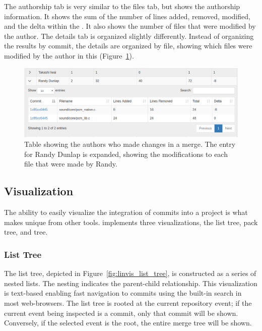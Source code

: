 The authorship tab is very similar to the files tab, but shows the
authorship information. It shows the sum of the number of lines added,
removed, modified, and the delta within the \mt. It also shows the
number of files that were modified by the author. The details tab is
organized slightly differently. Instead of organizing the results by
commit, the details are organized by file, showing which files were
modified by the author in this \mt (Figure~\ref{fig:linvis_authors}).

\begin{figure}[htpb]
  \centering
  \includegraphics[width=\linewidth]{figures/linvis/linvis_authors.png}
  \caption{Table showing the authors who made changes in a merge. The
    entry for Randy Dunlap is expanded, showing the modifications to
    each file that were made by Randy.}
  \label{fig:linvis_authors}
\end{figure}


\subsection{Visualization}
\label{sub:visualization}

The ability to easily visualize the integration of commits into a
project is what makes \tool unique from other tools. \tool implements
three visualizations, the list tree, pack tree, and \rt tree.

\subsubsection{List Tree}

The list tree, depicted in Figure~\ref{fig:linvis_list_tree}, is
constructed as a series of nested lists. The nesting indicates the
parent-child relationship. This visualization is text-based enabling
fast navigation to commits using the built-in search in most
web-browsers. The list tree is rooted at the current repository event;
if the current event being inspected is a commit, only that commit will
be shown. Conversely, if the selected event is the root, the entire
merge tree will be shown.

